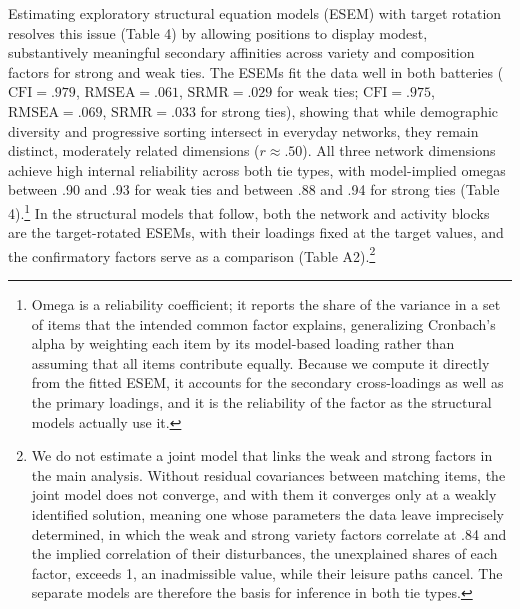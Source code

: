 \documentclass[
  12pt
]{article}
\begin{document}
Estimating exploratory structural equation models (ESEM) with target rotation resolves this issue (Table 4) by allowing positions to display modest, substantively meaningful secondary affinities across variety and composition factors for strong and weak ties. The ESEMs fit the data well in both batteries ($\text{CFI} = .979$, $\text{RMSEA} = .061$, $\text{SRMR} = .029$ for weak ties; $\text{CFI} = .975$, $\text{RMSEA} = .069$, $\text{SRMR} = .033$ for strong ties), showing that while demographic diversity and progressive sorting intersect in everyday networks, they remain distinct, moderately related dimensions ($r \approx .50$). All three network dimensions achieve high internal reliability across both tie types, with model-implied omegas between .90 and .93 for weak ties and between .88 and .94 for strong ties (Table 4).\footnote{Omega is a reliability coefficient; it reports the share of the variance in a set of items that the intended common factor explains, generalizing Cronbach's alpha by weighting each item by its model-based loading rather than assuming that all items contribute equally. Because we compute it directly from the fitted ESEM, it accounts for the secondary cross-loadings as well as the primary loadings, and it is the reliability of the factor as the structural models actually use it.} In the structural models that follow, both the network and activity blocks are the target-rotated ESEMs, with their loadings fixed at the target values, and the confirmatory factors serve as a comparison (Table A2).\footnote{We do not estimate a joint model that links the weak and strong factors in the main analysis. Without residual covariances between matching items, the joint model does not converge, and with them it converges only at a weakly identified solution, meaning one whose parameters the data leave imprecisely determined, in which the weak and strong variety factors correlate at .84 and the implied correlation of their disturbances, the unexplained shares of each factor, exceeds 1, an inadmissible value, while their leisure paths cancel. The separate models are therefore the basis for inference in both tie types.}
\end{document}
